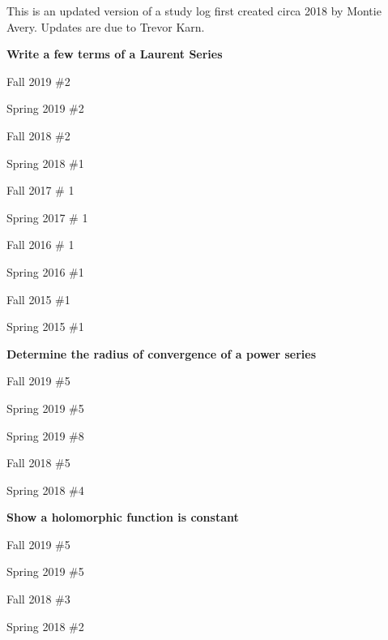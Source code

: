 \documentclass{article}
\begin{document}
\noindent This is an updated version of a study log first created circa 2018 by Montie Avery.
Updates are due to Trevor Karn.

\hfill

\textbf{Write a few terms of a Laurent Series}
\begin{todolist}
	\item Fall 2019 \#2
	\item Spring 2019 \#2
	\item Fall 2018 \#2
	\item Spring 2018 \#1
	\item Fall 2017 \# 1
	\item Spring 2017 \# 1
	\item Fall 2016 \# 1
	\item Spring 2016 \#1
	\item Fall 2015 \#1 
	\item Spring 2015 \#1
\end{todolist}

\textbf{Determine the radius of convergence of a power series}
\begin{todolist}
	\item Fall 2019 \#5
	\item Spring 2019 \#5
	\item Spring 2019 \#8
	\item Fall 2018 \#5
	\item Spring 2018 \#4
\end{todolist}

\textbf{Show a holomorphic function is constant}
\begin{todolist}
	\item Fall 2019 \#5
	\item Spring 2019 \#5
	\item Fall 2018 \#3
	\item Spring 2018 \#2
\end{todolist}
\end{document}
